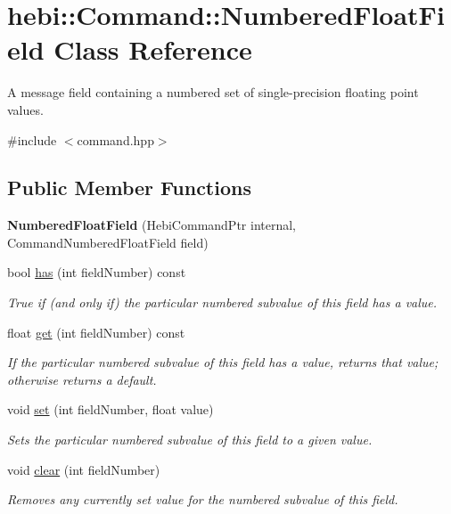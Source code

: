 \hypertarget{classhebi_1_1Command_1_1NumberedFloatField}{}\section{hebi\+:\+:Command\+:\+:Numbered\+Float\+Field Class Reference}
\label{classhebi_1_1Command_1_1NumberedFloatField}


A message field containing a numbered set of single-\/precision floating point values.  




{\ttfamily \#include $<$command.\+hpp$>$}

\subsection*{Public Member Functions}
\begin{DoxyCompactItemize}
\item 
\mbox{\label{classhebi_1_1Command_1_1NumberedFloatField_ae3c9e12a1fd0dfebe8574f5a25c1ddfc}} 
{\bfseries Numbered\+Float\+Field} (Hebi\+Command\+Ptr internal, Command\+Numbered\+Float\+Field field)
\item 
bool \hyperlink{classhebi_1_1Command_1_1NumberedFloatField_a769d29a5f0f92b73425da276a36b9a8c}{has} (int field\+Number) const
\begin{DoxyCompactList}\small\item\em True if (and only if) the particular numbered subvalue of this field has a value. \end{DoxyCompactList}\item 
float \hyperlink{classhebi_1_1Command_1_1NumberedFloatField_acada541f53f008b7fa577c12029dd955}{get} (int field\+Number) const
\begin{DoxyCompactList}\small\item\em If the particular numbered subvalue of this field has a value, returns that value; otherwise returns a default. \end{DoxyCompactList}\item 
void \hyperlink{classhebi_1_1Command_1_1NumberedFloatField_ad6ad3a44506da1ae4c274d44184c0123}{set} (int field\+Number, float value)
\begin{DoxyCompactList}\small\item\em Sets the particular numbered subvalue of this field to a given value. \end{DoxyCompactList}\item 
void \hyperlink{classhebi_1_1Command_1_1NumberedFloatField_af70c3b41077806589227f0475b06f12f}{clear} (int field\+Number)
\begin{DoxyCompactList}\small\item\em Removes any currently set value for the numbered subvalue of this field. \end{DoxyCompactList}\end{DoxyCompactItemize}


